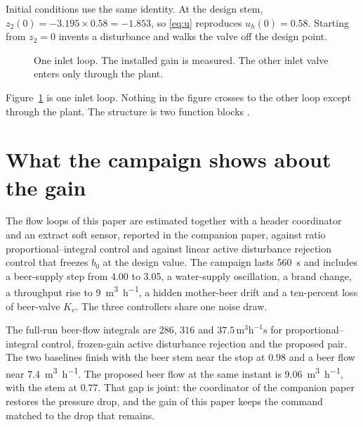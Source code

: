 \documentclass[conference,a4paper]{IEEEtran}
\begin{document}
Initial conditions use the same identity. At the design stem, $z_2(0)=-3.195\times 0.58=-1.853$, so \eqref{eq:u} reproduces $u_h(0)=0.58$. Starting from $z_2=0$ invents a disturbance and walks the valve off the design point.

\begin{figure}[!t]
\centering
{}
\caption{One inlet loop. The installed gain is measured. The other inlet valve enters only through the plant.}
\label{fig:loop}
\end{figure}

Figure~\ref{fig:loop} is one inlet loop. Nothing in the figure crosses to the other loop except through the plant. The structure is two function blocks \cite{madonski2019error,wu2021transition}.

\section{What the campaign shows about the gain}
The flow loops of this paper are estimated together with a header coordinator and an extract soft sensor, reported in the companion paper, against ratio proportional--integral control and against linear active disturbance rejection control that freezes $b_0$ at the design value. The campaign lasts \SI{560}{s} and includes a beer-supply step from \SI{4.00}{\barg} to \SI{3.05}{\barg}, a water-supply oscillation, a brand change, a throughput rise to \SI{9}{\cubic\metre\per\hour}, a hidden mother-beer drift and a ten-percent loss of beer-valve $K_v$. The three controllers share one noise draw.

The full-run beer-flow integrals are $286$, $316$ and $37.5\,\mathrm{m}^3\mathrm{h}^{-1}\mathrm{s}$ for proportional--integral control, frozen-gain active disturbance rejection and the proposed pair. The two baselines finish with the beer stem near the stop at $0.98$ and a beer flow near \SI{7.4}{\cubic\metre\per\hour}. The proposed beer flow at the same instant is \SI{9.06}{\cubic\metre\per\hour}, with the stem at $0.77$. That gap is joint: the coordinator of the companion paper restores the pressure drop, and the gain of this paper keeps the command matched to the drop that remains.
\end{document}
